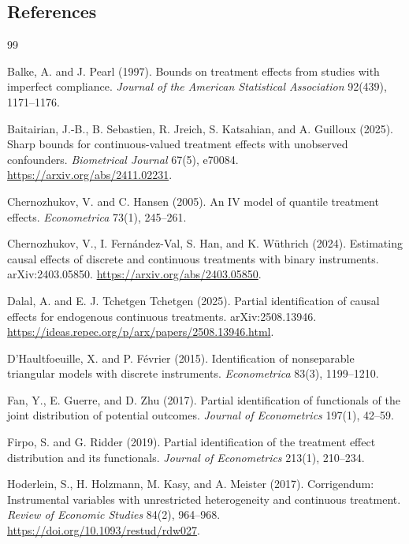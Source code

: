 \documentclass[11pt]{article}
\theoremstyle{definition}
\theoremstyle{plain}
\theoremstyle{remark}
\begin{document}
\subsection*{References}
\begin{thebibliography}{99}

Balke, A. and J. Pearl (1997).
\newblock Bounds on treatment effects from studies with imperfect compliance.
\newblock \emph{Journal of the American Statistical Association} 92(439), 1171--1176.

Baitairian, J.-B., B. Sebastien, R. Jreich, S. Katsahian, and A. Guilloux (2025).
\newblock Sharp bounds for continuous-valued treatment effects with unobserved confounders.
\newblock \emph{Biometrical Journal} 67(5), e70084. \url{https://arxiv.org/abs/2411.02231}.

Chernozhukov, V. and C. Hansen (2005).
\newblock An IV model of quantile treatment effects.
\newblock \emph{Econometrica} 73(1), 245--261.

Chernozhukov, V., I. Fern\'andez-Val, S. Han, and K. W\"uthrich (2024).
\newblock Estimating causal effects of discrete and continuous treatments with binary instruments.
\newblock arXiv:2403.05850. \url{https://arxiv.org/abs/2403.05850}.

Dalal, A. and E. J. Tchetgen Tchetgen (2025).
\newblock Partial identification of causal effects for endogenous continuous treatments.
\newblock arXiv:2508.13946. \url{https://ideas.repec.org/p/arx/papers/2508.13946.html}.

D'Haultfoeuille, X. and P. F\'evrier (2015).
\newblock Identification of nonseparable triangular models with discrete instruments.
\newblock \emph{Econometrica} 83(3), 1199--1210.

Fan, Y., E. Guerre, and D. Zhu (2017).
\newblock Partial identification of functionals of the joint distribution of potential outcomes.
\newblock \emph{Journal of Econometrics} 197(1), 42--59.

Firpo, S. and G. Ridder (2019).
\newblock Partial identification of the treatment effect distribution and its functionals.
\newblock \emph{Journal of Econometrics} 213(1), 210--234.

Hoderlein, S., H. Holzmann, M. Kasy, and A. Meister (2017).
\newblock Corrigendum: Instrumental variables with unrestricted heterogeneity and continuous treatment.
\newblock \emph{Review of Economic Studies} 84(2), 964--968. \url{https://doi.org/10.1093/restud/rdw027}.


\end{thebibliography}
\end{document}
